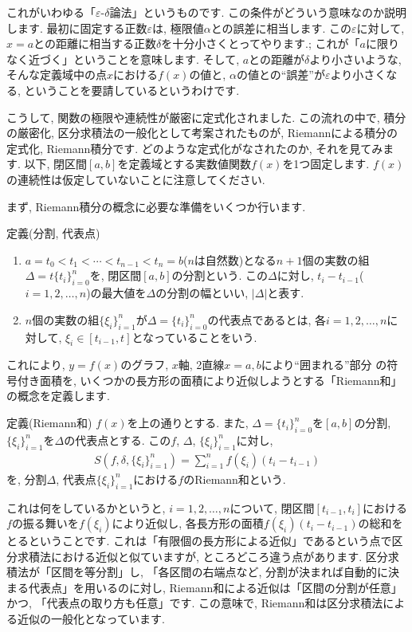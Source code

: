 \par これがいわゆる「$\varepsilon$-$\delta$論法」というものです. この条件がどういう意味なのか説明します. 最初に固定する正数$\varepsilon$は, 極限値$\alpha$との誤差に相当します. この$\varepsilon$に対して, $x=a$との距離に相当する正数$\delta$を十分小さくとってやります.; これが「$a$に限りなく近づく」ということを意味します. そして, $a$との距離が$\delta$より小さいような, そんな定義域中の点$x$における$f(x)$の値と, $\alpha$の値との“誤差”が$\varepsilon$より小さくなる, ということを要請しているというわけです. 
\par こうして, 関数の極限や連続性が厳密に定式化されました. この流れの中で, 積分の厳密化, 区分求積法の一般化として考案されたものが, Riemannによる積分の定式化, Riemann積分です. どのような定式化がなされたのか, それを見てみます. 以下, 閉区間$[a, b]$を定義域とする実数値関数$f(x)$を1つ固定します. $f(x)$の連続性は仮定していないことに注意してください. 
\par まず, Riemann積分の概念に必要な準備をいくつか行います. 
\begin{itembox}[l]{定義(分割, 代表点)}
\begin{enumerate}
\item $a=t_0<t_1<\cdots<t_{n-1}<t_n=b$($n$は自然数)となる$n+1$個の実数の組$\Delta=t\{t_i\}_{i=0}^{n}$を, 閉区間$[a,b]$の分割という. この$\Delta $に対し, $t_i-t_{i-1}$($i=1,2,\ldots,n$)の最大値を$\Delta$の分割の幅といい, $\left|\Delta\right|$と表す. 
\item $n$個の実数の組$\{\xi _i\}_{i=1}^{n}$が$\Delta=\{t_i\}_{i=0}^{n}$の代表点であるとは, 各$i=1,2,\ldots,n$に対して, $\xi _i \in [t_{i-1},t]$となっていることをいう. 
\end{enumerate}
\end{itembox}
これにより, $y=f(x)$のグラフ, $x$軸, 2直線$x=a,b$により“囲まれる”部分 の符号付き面積を, いくつかの長方形の面積により近似しようとする「Riemann和」の概念を定義します. 
\begin{itembox}[l]{定義(Riemann和)}
$f(x)$を上の通りとする. また, $\Delta=\{t_i\}_{i=0}^{n}$を$[a,b]$の分割, $\{\xi _i\}_{i=1}^{n}$を$\Delta$の代表点とする. この$f$, $\Delta$, $\{\xi _i\}_{i=1}^{n}$に対し, 
\begin{eqnarray}
S\left(f,\delta,\{\xi _i\}_{i=1}^{n}\right)=\sum_{i=1}^{n}f\left(\xi_{i} \right)(t_i - t_{i-1}) \nonumber
\end{eqnarray}
を, 分割$\Delta$, 代表点$\{\xi _i\}_{i=1}^{n}$における$f$のRiemann和という. 
\end{itembox}
\par これは何をしているかというと, $i=1,2,\ldots,n$について, 閉区間$[t_{i-1},t_i]$における$f$の振る舞いを$f\left(\xi_i\right)$により近似し, 各長方形の面積$f\left(\xi_{i} \right)(t_i - t_{i-1})$の総和をとるということです. これは「有限個の長方形による近似」であるという点で区分求積法における近似と似ていますが, ところどころ違う点があります. 区分求積法が「区間を等分割」し, 「各区間の右端点など, 分割が決まれば自動的に決まる代表点」を用いるのに対し, Riemann和による近似は「区間の分割が任意」かつ, 「代表点の取り方も任意」です. この意味で, Riemann和は区分求積法による近似の一般化となっています. 

